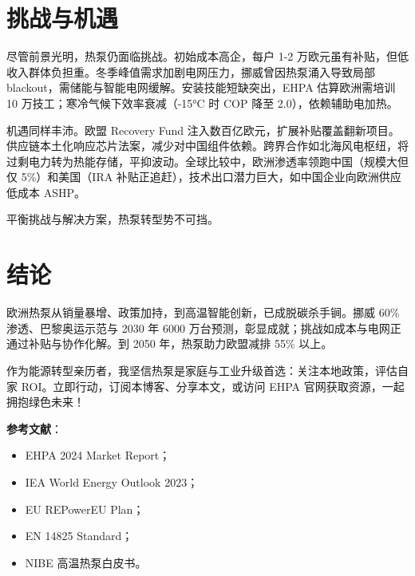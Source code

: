 \chapter{挑战与机遇}
尽管前景光明，热泵仍面临挑战。初始成本高企，每户 1-2 万欧元虽有补贴，但低收入群体负担重。冬季峰值需求加剧电网压力，挪威曾因热泵涌入导致局部 blackout，需储能与智能电网缓解。安装技能短缺突出，EHPA 估算欧洲需培训 10 万技工；寒冷气候下效率衰减（-15°C 时 COP 降至 2.0），依赖辅助电加热。\par
机遇同样丰沛。欧盟 Recovery Fund 注入数百亿欧元，扩展补贴覆盖翻新项目。供应链本土化响应芯片法案，减少对中国组件依赖。跨界合作如北海风电枢纽，将过剩电力转为热能存储，平抑波动。全球比较中，欧洲渗透率领跑中国（规模大但仅 5\%{}）和美国（IRA 补贴正追赶），技术出口潜力巨大，如中国企业向欧洲供应低成本 ASHP。\par
平衡挑战与解决方案，热泵转型势不可挡。\par
\chapter{结论}
欧洲热泵从销量暴增、政策加持，到高温智能创新，已成脱碳杀手锏。挪威 60\%{} 渗透、巴黎奥运示范与 2030 年 6000 万台预测，彰显成就；挑战如成本与电网正通过补贴与协作化解。到 2050 年，热泵助力欧盟减排 55\%{} 以上。\par
作为能源转型亲历者，我坚信热泵是家庭与工业升级首选：关注本地政策，评估自家 ROI。立即行动，订阅本博客、分享本文，或访问 EHPA 官网获取资源，一起拥抱绿色未来！\par
\textbf{参考文献}：\par
\begin{itemize}
\item EHPA 2024 Market Report；
\item IEA World Energy Outlook 2023；
\item EU REPowerEU Plan；
\item EN 14825 Standard；
\item NIBE 高温热泵白皮书。
\end{itemize}
